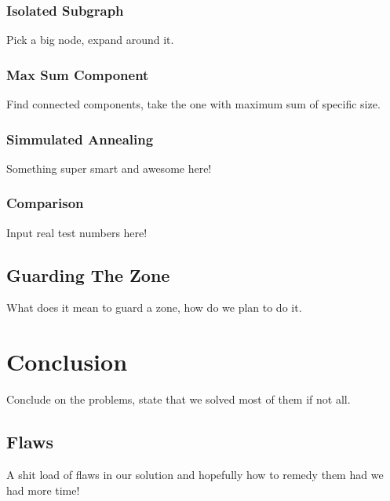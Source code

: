 \documentclass[11pt]{article}
\begin{document}
\subsubsection{Isolated Subgraph}
Pick a big node, expand around it.

\subsubsection{Max Sum Component}
Find connected components, take the one with maximum sum of specific size.

\subsubsection{Simmulated Annealing}
Something super smart and awesome here!

\subsubsection{Comparison}
Input real test numbers here!

\subsection{Guarding The Zone}
What does it mean to guard a zone, how do we plan to do it.

\section{Conclusion}
Conclude on the problems, state that we solved most of them if not all.

\subsection{Flaws}
A shit load of flaws in our solution and hopefully how to remedy them had we had more time!
\end{document}

